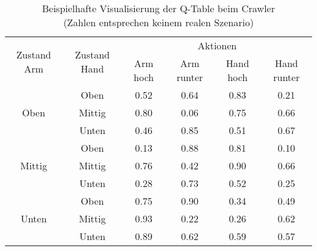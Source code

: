 \begin{table}
	\captionsetup{justification=centering}
	\caption{Beispielhafte Visualisierung der Q-Table beim Crawler \\ (Zahlen entsprechen keinem realen Szenario)}
	\centering
	\begin{tabular}{ |c|c|cccc| }
		\hline
	\multirow{2}{4em}{Zustand Arm} & \multirow{2}{4em}{Zustand Hand} & \multicolumn{4}{|c|}{Aktionen} \\
		& & Arm hoch & Arm runter             & Hand hoch & Hand runter \\
		\hline
	\multirow{3}{4em}{Oben} & Oben & 0.52 & 0.64 & 0.83 & 0.21 \\
		& Mittig & 0.80 & 0.06 & 0.75 & 0.66 \\
		& Unten & 0.46 & 0.85 & 0.51 & 0.67 \\
		\hline
	\multirow{3}{4em}{Mittig} & Oben & 0.13 & 0.88 & 0.81 & 0.10 \\
		& Mittig & 0.76 & 0.42 & 0.90 & 0.66 \\
		& Unten & 0.28 & 0.73 & 0.52 & 0.25 \\
	    \hline
	\multirow{3}{4em}{Unten} & Oben & 0.75 & 0.90 & 0.34 & 0.49 \\
		& Mittig & 0.93 & 0.22 & 0.26 & 0.62 \\
		& Unten & 0.89 & 0.62 & 0.59 & 0.57 \\
	    \hline
	\end{tabular}
\end{table}
